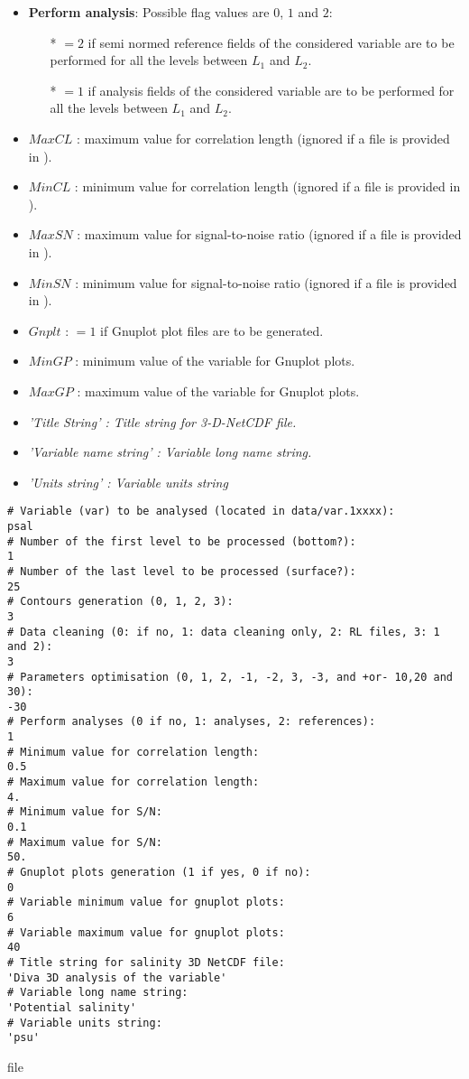 \begin{itemize}
\item {\bf Perform analysis}: Possible flag values are $0$, $1$ and $2$:
              \begin{itemize}
                \item[*] $=2$ if semi normed reference fields of the considered variable are to be performed for all the levels between $L_1$ and $L_2$.
                \item[*] $=1$ if analysis fields of the considered variable are to be performed for all the levels between $L_1$ and $L_2$.
              \end{itemize}
\item $MaxCL$ : maximum value for correlation length (ignored if a  file is provided in ).
\item $MinCL$ : minimum value for correlation length  (ignored if a  file is provided in ).
\item $MaxSN$ : maximum value for signal-to-noise ratio (ignored if a  file is provided in ).
\item $MinSN$ : minimum value for signal-to-noise ratio (ignored if a  file is provided in ).
\item $Gnplt$ : $=1$ if Gnuplot plot files are to be generated.
\item $MinGP$ : minimum value of the variable for Gnuplot plots.
\item $MaxGP$ : maximum value of the variable for Gnuplot plots.
\item \it{'Title String'} : Title string for 3-D-NetCDF file.
\item \it{'Variable name string'} : Variable long name string.
\item \it{'Units string'} : Variable units string
\end{itemize}


\begin{exfile}[H] %
\begin{footnotesize}
\begin{verbatim}
# Variable (var) to be analysed (located in data/var.1xxxx):
psal
# Number of the first level to be processed (bottom?):
1
# Number of the last level to be processed (surface?):
25
# Contours generation (0, 1, 2, 3):
3
# Data cleaning (0: if no, 1: data cleaning only, 2: RL files, 3: 1 and 2):
3
# Parameters optimisation (0, 1, 2, -1, -2, 3, -3, and +or- 10,20 and 30):
-30
# Perform analyses (0 if no, 1: analyses, 2: references):
1
# Minimum value for correlation length:
0.5
# Maximum value for correlation length:
4.
# Minimum value for S/N:
0.1
# Maximum value for S/N:
50.
# Gnuplot plots generation (1 if yes, 0 if no):
0
# Variable minimum value for gnuplot plots:
6
# Variable maximum value for gnuplot plots:
40
# Title string for salinity 3D NetCDF file:
'Diva 3D analysis of the variable'
# Variable long name string:
'Potential salinity'
# Variable units string:
'psu'
\end{verbatim}
\end{footnotesize}
\caption{ file}
\label{3Dinfotfile}
\end{exfile}

